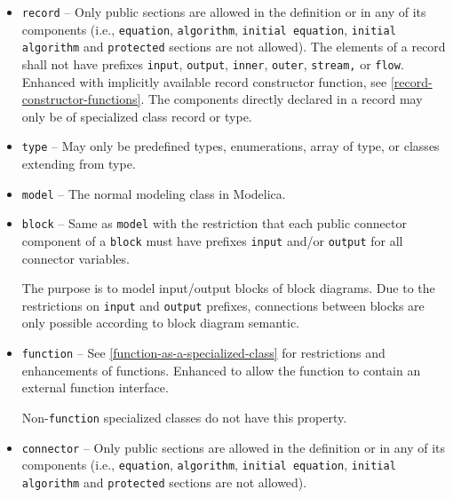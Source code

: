 \begin{itemize}
\item \lstinline!record! --
Only public sections are allowed in the definition or in any of its components (i.e., \lstinline!equation!, \lstinline!algorithm!, \lstinline!initial equation!, \lstinline!initial algorithm! and \lstinline!protected! sections are not allowed).  The elements of a record shall not have prefixes \lstinline!input!, \lstinline!output!, \lstinline!inner!, \lstinline!outer!, \lstinline!stream,! or \lstinline!flow!.  Enhanced with implicitly available record constructor function, see \cref{record-constructor-functions}.  The components directly declared in a record may only be of specialized class record or type.

\item \lstinline!type! --
May only be predefined types, enumerations, array of type, or classes extending from type.

\item \lstinline!model! --
The normal modeling class in Modelica.

\item \lstinline!block! --
Same as \lstinline!model! with the restriction that each public connector component of a \lstinline!block! must have prefixes \lstinline!input! and/or \lstinline!output! for all connector variables.

\begin{nonnormative}
The purpose is to model input/output blocks of block diagrams.  Due to the restrictions on \lstinline!input! and \lstinline!output! prefixes,
connections between blocks are only possible according to block diagram semantic.
\end{nonnormative}

\item \lstinline!function! --
See \cref{function-as-a-specialized-class} for restrictions and enhancements of functions. Enhanced to allow the function to contain an external function interface.

\begin{nonnormative}
Non-\lstinline!function! specialized classes do not have this property.
\end{nonnormative}

\item \lstinline!connector! --
Only public sections are allowed in the definition or in any of its components (i.e., \lstinline!equation!, \lstinline!algorithm!, \lstinline!initial equation!, \lstinline!initial algorithm! and \lstinline!protected! sections are not allowed).


\end{itemize}
